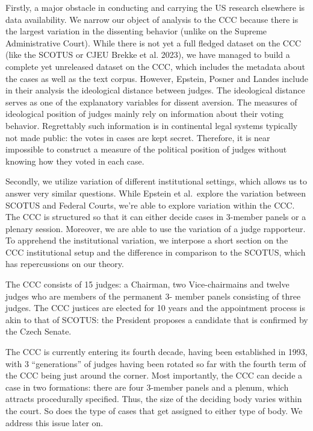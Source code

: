 \documentclass[
  11pt,
]{article}
\begin{document}
Firstly, a major obstacle in conducting and carrying the US research
elsewhere is data availability. We narrow our object of analysis to the
CCC because there is the largest variation in the dissenting behavior
(unlike on the Supreme Administrative Court). While there is not yet a
full fledged dataset on the CCC (like the SCOTUS or CJEU Brekke et al.
2023), we have managed to build a complete yet unreleased dataset on the
CCC, which includes the metadata about the cases as well as the text
corpus. However, Epstein, Posner and Landes include in their analysis
the ideological distance between judges. The ideological distance serves
as one of the explanatory variables for dissent aversion. The measures
of ideological position of judges mainly rely on information about their
voting behavior. Regrettably such information is in continental legal
systems typically not made public: the votes in cases are kept secret.
Therefore, it is near impossible to construct a measure of the political
position of judges without knowing how they voted in each case.

Secondly, we utilize variation of different institutional settings,
which allows us to answer very similar questions. While Epstein et
al.~explore the variation between SCOTUS and Federal Courts, we're able
to explore variation within the CCC. The CCC is structured so that it
can either decide cases in 3-member panels or a plenary session.
Moreover, we are able to use the variation of a judge rapporteur. To
apprehend the institutional variation, we interpose a short section on
the CCC institutional setup and the difference in comparison to the
SCOTUS, which has repercussions on our theory.

The CCC consists of 15 judges: a Chairman, two Vice-chairmains and
twelve judges who are members of the permanent 3- member panels
consisting of three judges. The CCC justices are elected for 10 years
and the appointment process is akin to that of SCOTUS: the President
proposes a candidate that is confirmed by the Czech Senate.

The CCC is currently entering its fourth decade, having been established
in 1993, with 3 ``generations'' of judges having been rotated so far
with the fourth term of the CCC being just around the corner. Most
importantly, the CCC can decide a case in two formations: there are four
3-member panels and a plenum, which attracts procedurally specified.
Thus, the size of the deciding body varies within the court. So does the
type of cases that get assigned to either type of body. We address this
issue later on.
\end{document}
